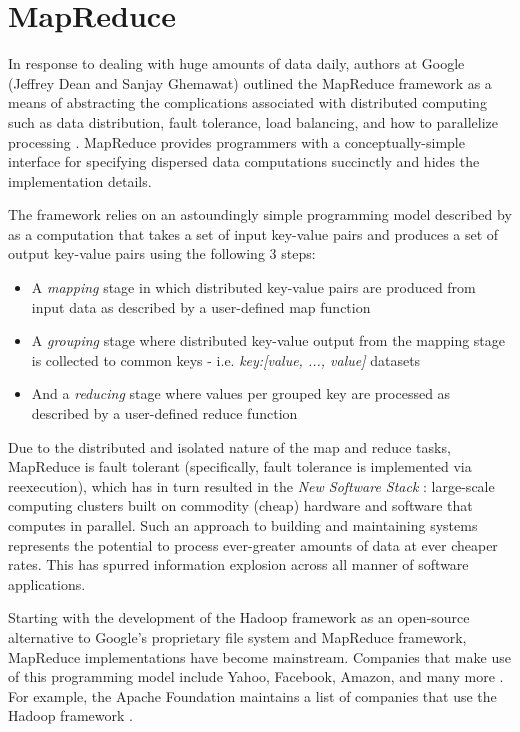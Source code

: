 \section{MapReduce}
In response to dealing with huge amounts of data daily, authors at Google (Jeffrey Dean and Sanjay Ghemawat) outlined the MapReduce framework as a means of abstracting the complications associated with distributed computing such as data distribution, fault tolerance, load balancing, and how to parallelize processing \cite{Dean:2008}. MapReduce provides programmers with a conceptually-simple interface for specifying dispersed data computations succinctly and hides the implementation details.

The framework relies on an astoundingly simple programming model described by \cite{Dean:2008} as a computation that takes a set of input key-value pairs and produces a set of output key-value pairs using the following 3 steps:

\begin{itemize}
    \item A \textit{mapping} stage in which distributed key-value pairs are produced from input data as described by a user-defined map function
    \item A \textit{grouping} stage where distributed key-value output from the mapping stage is collected to common keys - i.e. \textit{key:[value, ..., value]} datasets
    \item And a \textit{reducing} stage where values per grouped key are processed as described by a user-defined reduce function
\end{itemize}

Due to the distributed and isolated nature of the map and reduce tasks, MapReduce is fault tolerant (specifically, fault tolerance is implemented via reexecution), which has in turn resulted in the \textit{New Software Stack} \cite{mining2011}: large-scale computing clusters built on commodity (cheap) hardware and software that computes in parallel. Such an approach to building and maintaining systems represents the potential to process ever-greater amounts of data at ever cheaper rates. This has spurred information explosion across all manner of software applications.

Starting with the development of the Hadoop framework as an open-source alternative to Google's proprietary file system and MapReduce framework, MapReduce implementations have become mainstream. Companies that make use of this programming model include Yahoo, Facebook, Amazon, and many more \cite{chandar2010}. For example, the Apache Foundation maintains a list of companies that use the Hadoop framework \cite{hadoopPower:2017}.

